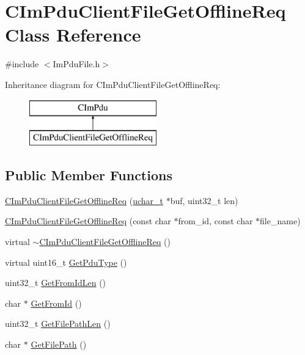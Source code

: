 \hypertarget{class_c_im_pdu_client_file_get_offline_req}{}\section{C\+Im\+Pdu\+Client\+File\+Get\+Offline\+Req Class Reference}
\label{class_c_im_pdu_client_file_get_offline_req}


{\ttfamily \#include $<$Im\+Pdu\+File.\+h$>$}

Inheritance diagram for C\+Im\+Pdu\+Client\+File\+Get\+Offline\+Req\+:\begin{figure}[H]
\begin{center}
\leavevmode
\includegraphics[height=2.000000cm]{class_c_im_pdu_client_file_get_offline_req}
\end{center}
\end{figure}
\subsection*{Public Member Functions}
\begin{DoxyCompactItemize}
\item 
\hyperlink{class_c_im_pdu_client_file_get_offline_req_ac626021156b8c78f1db07b7e1f1dff13}{C\+Im\+Pdu\+Client\+File\+Get\+Offline\+Req} (\hyperlink{base_2ostype_8h_a124ea0f8f4a23a0a286b5582137f0b8d}{uchar\+\_\+t} $\ast$buf, uint32\+\_\+t len)
\item 
\hyperlink{class_c_im_pdu_client_file_get_offline_req_a117cf866d58d30cc3fa0b4a186f37096}{C\+Im\+Pdu\+Client\+File\+Get\+Offline\+Req} (const char $\ast$from\+\_\+id, const char $\ast$file\+\_\+name)
\item 
virtual \hyperlink{class_c_im_pdu_client_file_get_offline_req_ae002cbd19d2551e3d3bf0c2f37a1c46d}{$\sim$\+C\+Im\+Pdu\+Client\+File\+Get\+Offline\+Req} ()
\item 
virtual uint16\+\_\+t \hyperlink{class_c_im_pdu_client_file_get_offline_req_a7b190ab7bc616107c5a0536611f0824f}{Get\+Pdu\+Type} ()
\item 
uint32\+\_\+t \hyperlink{class_c_im_pdu_client_file_get_offline_req_a9b2727539f2487795d6aa3b37a02c061}{Get\+From\+Id\+Len} ()
\item 
char $\ast$ \hyperlink{class_c_im_pdu_client_file_get_offline_req_af3c35defec31ec0a1dc45f9330a59d59}{Get\+From\+Id} ()
\item 
uint32\+\_\+t \hyperlink{class_c_im_pdu_client_file_get_offline_req_a0f8c8f512b7c8f7c6f66e8c210407e3f}{Get\+File\+Path\+Len} ()
\item 
char $\ast$ \hyperlink{class_c_im_pdu_client_file_get_offline_req_a8a2a3d38dda012b1ba379f7a2a6718d0}{Get\+File\+Path} ()
\end{DoxyCompactItemize}
